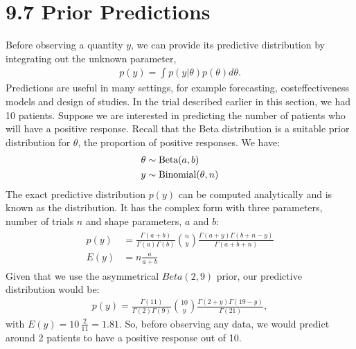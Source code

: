 \documentclass[letterpaper,10pt,english]{jupyterBook}
\begin{document}
\section{9.7 Prior Predictions}
\label{\detokenize{09.h. Bayesian Statistics I:prior-predictions}}\label{\detokenize{09.h. Bayesian Statistics I::doc}}
\sphinxAtStartPar
Before observing a quantity \(y\), we can provide its predictive distribution by integrating out the unknown parameter,
\begin{equation*}
\begin{split}
p(y) = \int p(y|\theta) p(\theta) d\theta.
\end{split}
\end{equation*}
\sphinxAtStartPar
Predictions are useful in many settings, for example forecasting, cost\sphinxhyphen{}effectiveness models and design of
studies. In the trial described earlier in this section, we had 10 patients. Suppose we are interested in predicting the number of patients who will have a positive response. Recall that the Beta distribution is a suitable prior distribution for \(\theta\), the proportion of positive responses. We have:
\begin{equation*}
\begin{split}
\begin{align*}
\theta &\sim \hbox{Beta}(a,b) \\
	y &\sim \hbox{Binomial}(\theta,n)
\end{align*}
\end{split}
\end{equation*}
\sphinxAtStartPar
The exact predictive distribution \(p(y)\) can be computed analytically and is known as the  distribution. It has the complex form with three parameters,  number of trials \(n\) and shape parameters, \(a\) and \(b\):
\begin{equation*}
\begin{split}
\begin{align*}
p(y) &=  \frac{ \Gamma (a+ b)}{ \Gamma (a) \Gamma (b) }  {n \choose y}  \frac{\Gamma (a+ y) \Gamma (b+n-y)}{\Gamma (a+b+n)} \\
E(y) &=  n \frac{a}{a+b}
\end{align*}
\end{split}
\end{equation*}
\sphinxAtStartPar
Given that we use the asymmetrical \(Beta(2, 9)\) prior, our predictive distribution would be:
\begin{equation*}
\begin{split}
p(y) =  \frac{ \Gamma (11)}{ \Gamma (2) \Gamma (9) }  {10 \choose y}  \frac{\Gamma (2+ y) \Gamma (19-y)}{\Gamma (21)},
\end{split}
\end{equation*}
\sphinxAtStartPar
with \(E(y) =  10 \, \frac{2}{11} = 1.81\). So, before observing any data, we would predict around 2 patients to have a positive response out of 10.
\end{document}
